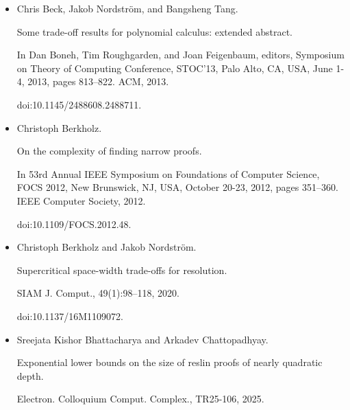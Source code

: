 \begin{itemize}
In Yael Tauman Kalai, editor, 14th Innovations in Theoretical
Computer Science Conference (ITCS 2023), volume 251 of Leibniz
International Proceedings in Informatics (LIPIcs), pages 14:1–14:17,
Dagstuhl, Germany, 2023. Schloss Dagstuhl – Leibniz-Zentrum für
Informatik.


doi:10.4230/LIPIcs.ITCS.2023.14.





\item 
[6]

Chris Beck, Jakob Nordström, and Bangsheng Tang.


Some trade-off results for polynomial calculus: extended abstract.


In Dan Boneh, Tim Roughgarden, and Joan Feigenbaum, editors, Symposium on Theory of Computing Conference, STOC’13, Palo Alto, CA, USA,
June 1-4, 2013, pages 813–822. ACM, 2013.


doi:10.1145/2488608.2488711.





\item 
[7]

Christoph Berkholz.


On the complexity of finding narrow proofs.


In 53rd Annual IEEE Symposium on Foundations of Computer
Science, FOCS 2012, New Brunswick, NJ, USA, October 20-23, 2012, pages
351–360. IEEE Computer Society, 2012.


doi:10.1109/FOCS.2012.48.





\item 
[8]

Christoph Berkholz and Jakob Nordström.


Supercritical space-width trade-offs for resolution.


SIAM J. Comput., 49(1):98–118, 2020.


doi:10.1137/16M1109072.





\item 
[9]

Sreejata Kishor Bhattacharya and Arkadev Chattopadhyay.


Exponential lower bounds on the size of reslin proofs of nearly
quadratic depth.


Electron. Colloquium Comput. Complex., TR25-106, 2025.



\end{itemize}
